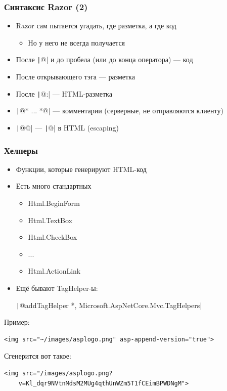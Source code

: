 \documentclass{../../slides-style}
\begin{document}
    \begin{frame}
        \frametitle{Синтаксис Razor (2)}
        \begin{itemize}
            \item Razor сам пытается угадать, где разметка, а где код
            \begin{itemize}
                \item Но у него не всегда получается
            \end{itemize}
            \item После \texttt|@| и до пробела (или до конца оператора) --- код
            \item После открывающего тэга --- разметка
            \item После \texttt|@:| --- HTML-разметка
            \item \texttt|@* ... *@| --- комментарии (серверные, не отправляются клиенту)
            \item \texttt|@@| --- \texttt|@| в HTML (escaping)
        \end{itemize}
    \end{frame}

    \begin{frame}[fragile]
        \frametitle{Хелперы}
        \begin{itemize}
            \item Функции, которые генерируют HTML-код
            \item Есть много стандартных
            \begin{itemize}
                \item Html.BeginForm
                \item Html.TextBox
                \item Html.CheckBox
                \item ...
                \item Html.ActionLink
            \end{itemize}
            \item Ещё бывают TagHelper-ы:
            
            \texttt|@addTagHelper *, Microsoft.AspNetCore.Mvc.TagHelpers|
        \end{itemize}
        Пример: 
        \begin{verbatim}
<img src="~/images/asplogo.png" asp-append-version="true">
        \end{verbatim}
        Сгенерится вот такое:
        \begin{verbatim}
<img src="/images/asplogo.png?
    v=Kl_dqr9NVtnMdsM2MUg4qthUnWZm5T1fCEimBPWDNgM">
        \end{verbatim}
    \end{frame}
\end{document}
